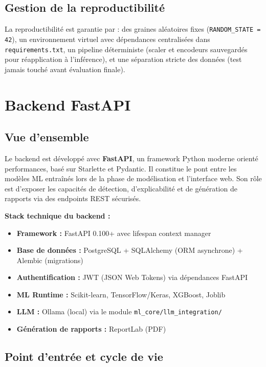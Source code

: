 \documentclass[12pt,a4paper,twoside]{report}
\begin{document}
\subsection{Gestion de la reproductibilité}

La reproductibilité est garantie par : des graines aléatoires fixes (\texttt{RANDOM\_STATE = 42}), un environnement virtuel avec dépendances centralisées dans \texttt{requirements.txt}, un pipeline déterministe (scaler et encodeurs sauvegardés pour réapplication à l'inférence), et une séparation stricte des données (test jamais touché avant évaluation finale).

\section{Backend FastAPI}

\subsection{Vue d'ensemble}

Le backend est développé avec \textbf{FastAPI}, un framework Python moderne orienté performances, basé sur Starlette et Pydantic. Il constitue le pont entre les modèles ML entraînés lors de la phase de modélisation et l'interface web. Son rôle est d'exposer les capacités de détection, d'explicabilité et de génération de rapports via des endpoints REST sécurisés.

\begin{techbox}
\textbf{Stack technique du backend :}
\begin{itemize}
  \item \textbf{Framework :} FastAPI 0.100+ avec lifespan context manager
  \item \textbf{Base de données :} PostgreSQL + SQLAlchemy (ORM asynchrone) + Alembic (migrations)
  \item \textbf{Authentification :} JWT (JSON Web Tokens) via dépendances FastAPI
  \item \textbf{ML Runtime :} Scikit-learn, TensorFlow/Keras, XGBoost, Joblib
  \item \textbf{LLM :} Ollama (local) via le module \texttt{ml\_core/llm\_integration/}
  \item \textbf{Génération de rapports :} ReportLab (PDF)
\end{itemize}
\end{techbox}

\subsection{Point d'entrée et cycle de vie}
\end{document}
